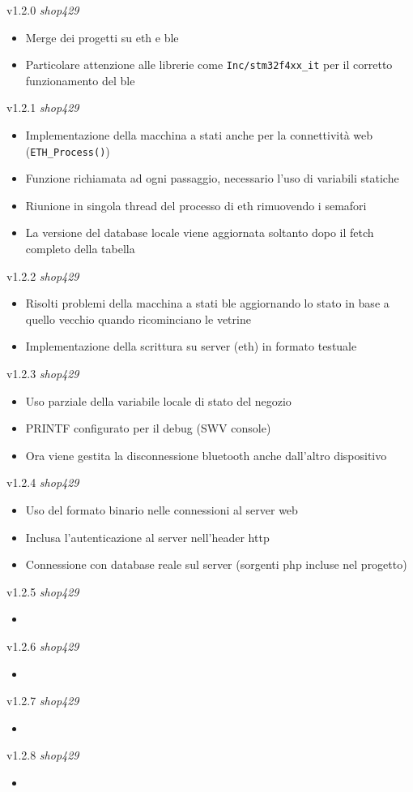 v1.2.0 \textit{shop429}
	\begin{itemize}
		\item Merge dei progetti su eth e ble
		\item Particolare attenzione alle librerie come \texttt{Inc/stm32f4xx\_it} per il corretto funzionamento del ble
	\end{itemize}
v1.2.1 \textit{shop429}
	\begin{itemize}
		\item Implementazione della macchina a stati anche per la connettivit\`{a} web (\texttt{ETH\_Process()})
		\item Funzione richiamata ad ogni passaggio, necessario l'uso di variabili statiche
		\item Riunione in singola thread del processo di eth rimuovendo i semafori
		\item La versione del database locale viene aggiornata soltanto dopo il fetch completo della tabella
	\end{itemize}
v1.2.2 \textit{shop429}
	\begin{itemize}
		\item Risolti problemi della macchina a stati ble aggiornando lo stato in base a quello vecchio quando ricominciano le vetrine
		\item Implementazione della scrittura su server (eth) in formato testuale
	\end{itemize}
v1.2.3 \textit{shop429}
	\begin{itemize}
		\item Uso parziale della variabile locale di stato del negozio
		\item PRINTF configurato per il debug (SWV console)
		\item Ora viene gestita la disconnessione bluetooth anche dall'altro dispositivo
	\end{itemize}
v1.2.4 \textit{shop429}
	\begin{itemize}
		\item Uso del formato binario nelle connessioni al server web
		\item Inclusa l'autenticazione al server nell'header http
		\item Connessione con database reale sul server (sorgenti php incluse nel progetto)
	\end{itemize}
v1.2.5 \textit{shop429}
  \begin{itemize}
  	\item
  \end{itemize}
v1.2.6 \textit{shop429}
  \begin{itemize}
  	\item
  \end{itemize}
v1.2.7 \textit{shop429}
  \begin{itemize}
  	\item
  \end{itemize}
v1.2.8 \textit{shop429}
  \begin{itemize}
  	\item
  \end{itemize}

